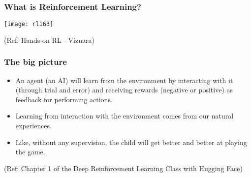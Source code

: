 \begin{frame}[fragile]\frametitle{What is Reinforcement Learning?}

\begin{center}
\texttt{[image: rl163]}

{\tiny (Ref: Hands-on RL - Vizuara)}

\end{center}


\end{frame}

\begin{frame}[fragile]\frametitle{The big picture}
\begin{itemize}
\item An agent (an AI) will learn from the environment by interacting with it (through trial and error) and receiving rewards (negative or positive) as feedback for performing actions.
\item Learning from interaction with the environment comes from our natural experiences.
\item Like, without any supervision, the child will get better and better at playing the game.
\end{itemize}

{\tiny (Ref: Chapter 1 of the Deep Reinforcement Learning Class with Hugging Face)}


\end{frame}

